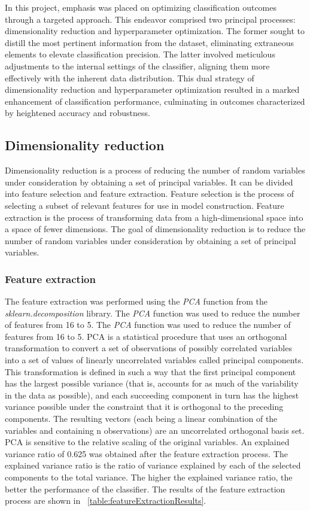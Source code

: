 \documentclass[conference,onecolumn]{IEEEtran}
\begin{document}
    In this project, emphasis was placed on optimizing classification outcomes through a targeted approach. This endeavor comprised two principal processes: dimensionality reduction and hyperparameter optimization. The former sought to distill the most pertinent information from the dataset, eliminating extraneous elements to elevate classification precision. The latter involved meticulous adjustments to the internal settings of the classifier, aligning them more effectively with the inherent data distribution. This dual strategy of dimensionality reduction and hyperparameter optimization resulted in a marked enhancement of classification performance, culminating in outcomes characterized by heightened accuracy and robustness.
    \subsection{Dimensionality reduction}
        Dimensionality reduction is a process of reducing the number of random variables under consideration by obtaining a set of principal variables. It can be divided into feature selection and feature extraction. Feature selection is the process of selecting a subset of relevant features for use in model construction. Feature extraction is the process of transforming data from a high-dimensional space into a space of fewer dimensions. The goal of dimensionality reduction is to reduce the number of random variables under consideration by obtaining a set of principal variables.
        
        \subsubsection{Feature extraction}
            The feature extraction was performed using the \emph{PCA} function from the \emph{sklearn.decomposition} library. The \emph{PCA} function was used to reduce the number of features from 16 to 5. The \emph{PCA} function was used to reduce the number of features from 16 to 5.
            PCA is a statistical procedure that uses an orthogonal transformation to convert a set of observations of possibly correlated variables into a set of values of linearly uncorrelated variables called principal components. This transformation is defined in such a way that the first principal component has the largest possible variance (that is, accounts for as much of the variability in the data as possible), and each succeeding component in turn has the highest variance possible under the constraint that it is orthogonal to the preceding components. The resulting vectors (each being a linear combination of the variables and containing n observations) are an uncorrelated orthogonal basis set. PCA is sensitive to the relative scaling of the original variables.
            An explained variance ratio of 0.625 was obtained after the feature extraction process. The explained variance ratio is the ratio of variance explained by each of the selected components to the total variance. The higher the explained variance ratio, the better the performance of the classifier. The results of the feature extraction process are shown in \tablename~\ref{table:featureExtractionResults}.
\end{document}
